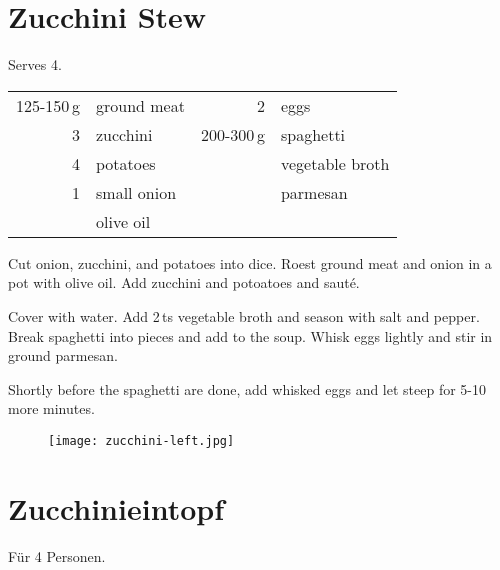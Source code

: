 \section{Zucchini Stew}

\begin{centering}

Serves 4.

\end{centering}

\begin{table}[H]
  \centering
    
  \begin{tabular*}{1\textwidth}{rlrl}
125-150\,g & ground meat & 2 & eggs \\
3 & zucchini & 200-300\,g & spaghetti \\
4 & potatoes & & vegetable broth \\
1 & small onion & & parmesan \\
 & olive oil & & \\
\end{tabular*}
\end{table}

\begin{Notes}
\item Cut onion, zucchini, and potatoes into dice. Roest ground meat and onion in a pot with olive oil. Add zucchini and potoatoes and saut\'{e}.

\item Cover with water. Add 2\,ts vegetable broth and season with salt and pepper. Break spaghetti into pieces and add to the soup. Whisk eggs lightly and stir in ground parmesan.

\item Shortly before the spaghetti are done, add whisked eggs and let steep for 5-10 more minutes.
\end{Notes}
\vfill
\begin{figure}[H]
  \centering
  \texttt{[image: zucchini-left.jpg]}
\end{figure}
\newpage

\section*{Zucchinieintopf}

\begin{centering}

F\"{u}r 4 Personen.

\end{centering}

